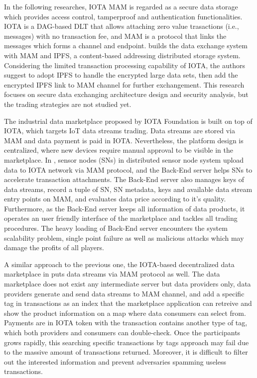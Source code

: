 \documentclass[conference]{IEEEtran}
\begin{document}
In the following researches, IOTA MAM is regarded as a secure data storage which provides access control, tamperproof and authentication functionalities. IOTA is a DAG-based DLT that allows attaching zero value trasactions (i.e., messages) with no transaction fee, and MAM is a protocol that links the messages which forms a channel and endpoint. \cite{luDecentralizedDM} builds the data exchange system with MAM and IPFS\cite{IPFS}, a content-based addressing distributed storage system. Considering the limited transaction processing capability of IOTA, the authors suggest to adopt IPFS to handle the encrypted large data sets, then add the encrypted IPFS link to MAM channel for further exchangement. This research focuses on secure data exchanging architecture design and security analysis, but the trading strategies are not studied yet.

The industrial data marketplace\cite{IOTAIdustryMarketplace} proposed by IOTA Foundation is built on top of IOTA, which targets IoT data streams trading. Data streams are stored via MAM and data payment is paid in IOTA. Nevertheless, the platform design is centralized, where new devices require manual approval to be visible in the marketplace. In \cite{IOTASensorNode}, sensor nodes (SNs) in distributed sensor node system upload data to IOTA network via MAM protocol, and the Back-End server helps SNs to accelerate transaction attachments. The Back-End server also manages keys of data streams, record a tuple of SN, SN metadata, keys and available data stream entry points on MAM, and evaluates data price according to it's quality. Furthermore, as the Back-End server keeps all information of data products, it operates an user friendly interface of the marketplace and tackles all trading procedures. The heavy loading of Back-End server encounters the system scalability problem, single point failure as well as malicious attacks which may damage the profits of all players. 

A similar approach to the previous one, the IOTA-based decentralized data marketplace in \cite{DDMSmartCities} puts data streams via MAM protocol as well. The data marketplace does not exist any intermediate server but data providers only, data providers generate and send data streams to MAM channel, and add a specific tag in transactions as an index that the marketplace application can retreive and show the product information on a map where data consumers can select from. Payments are in IOTA token with the transaction contains another type of tag, which both providers and consumers can double-check. Once the participants grows rapidly, this searching specific transactions by tags approach may fail due to the massive amount of transactions returned. Moreover, it is difficult to filter out the interested information and prevent adversaries spamming useless transactions.  
\end{document}
